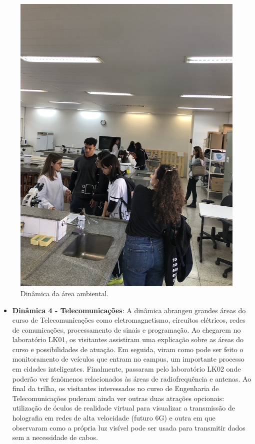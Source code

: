 \documentclass[
  letterpaper,
  DIV=11,
  numbers=noendperiod]{scrreprt}
\providecommand{\tightlist}{%
  \setlength{\itemsep}{0pt}\setlength{\parskip}{0pt}}\usepackage{longtable,booktabs,array}
\begin{document}
\begin{figure}[H]

{\centering \includegraphics[width=0.6\linewidth,height=\textheight,keepaspectratio]{planejamento/dinamica-ambiental.jpg}

}

\caption{Dinâmica da área ambiental.}

\end{figure}%

\begin{itemize}
\tightlist
\item
  \textbf{Dinâmica 4 - Telecomunicações}: A dinâmica abrangeu grandes
  áreas do curso de Telecomunicações como eletromagnetismo, circuitos
  elétricos, redes de comunicações, processamento de sinais e
  programação. Ao chegarem no laboratório LK01, os visitantes assistiram
  uma explicação sobre as áreas do curso e possibilidades de atuação. Em
  seguida, viram como pode ser feito o monitoramento de veículos que
  entram no campus, um importante processo em cidades inteligentes.
  Finalmente, passaram pelo laboratório LK02 onde poderão ver fenômenos
  relacionados às áreas de radiofrequência e antenas. Ao final da
  trilha, os visitantes interessados no curso de Engenharia de
  Telecomunicações puderam ainda ver outras duas atrações opcionais:
  utilização de óculos de realidade virtual para visualizar a
  transmissão de holografia em redes de alta velocidade (futuro 6G) e
  outra em que observaram como a própria luz visível pode ser usada para
  transmitir dados sem a necessidade de cabos.
\end{itemize}
\end{document}
